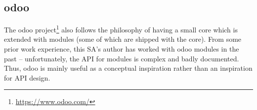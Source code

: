 \subsection{odoo}
The odoo project\footnote{\url{https://www.odoo.com/}} also follows the
philosophy of having a small core which is extended with modules (some of which
are shipped with the core). From some prior work experience, this SA's author
has worked with odoo modules in the past -- unfortunately, the API for modules
is complex and badly documented. Thus, odoo is mainly useful as a conceptual
inspiration rather than an inspiration for API design.

